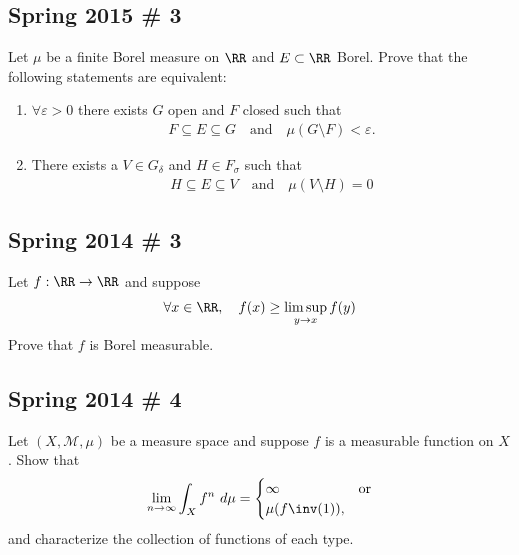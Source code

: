 \hypertarget{spring-2015-3}{%
\subsection{Spring 2015 \# 3}\label{spring-2015-3}}

Let \(\mu\) be a finite Borel measure on \(\RR\) and \(E \subset \RR\)
Borel. Prove that the following statements are equivalent:

\begin{enumerate}
\def\labelenumi{\arabic{enumi}.}
\tightlist
\item
  \(\forall \varepsilon > 0\) there exists \(G\) open and \(F\) closed
  such that
  \begin{align*}
  F \subseteq E \subseteq G \quad \text{and} \quad \mu(G\setminus F) < \varepsilon.
  \end{align*}
\item
  There exists a \(V \in G_\delta\) and \(H \in F_\sigma\) such that
  \begin{align*}
  H \subseteq E \subseteq V \quad \text{and}\quad \mu(V\setminus H) = 0
  \end{align*}
\end{enumerate}

\hypertarget{spring-2014-3}{%
\subsection{Spring 2014 \# 3}\label{spring-2014-3}}

Let \(f: \RR \to \RR\) and suppose
\begin{align*}
\forall x\in \RR,\quad f(x) \geq \limsup _{y \rightarrow x} f(y)
\end{align*} Prove that \(f\) is Borel measurable.

\hypertarget{spring-2014-4}{%
\subsection{Spring 2014 \# 4}\label{spring-2014-4}}

Let \((X, \mathcal M, \mu)\) be a measure space and suppose \(f\) is a
measurable function on \(X\). Show that
\begin{align*}
\lim _{n \rightarrow \infty} \int_{X} f^{n} ~d \mu =
\begin{cases}
\infty & \text{or} \\
\mu(f\inv(1)),
\end{cases}
\end{align*} and characterize the collection of functions of each type.

